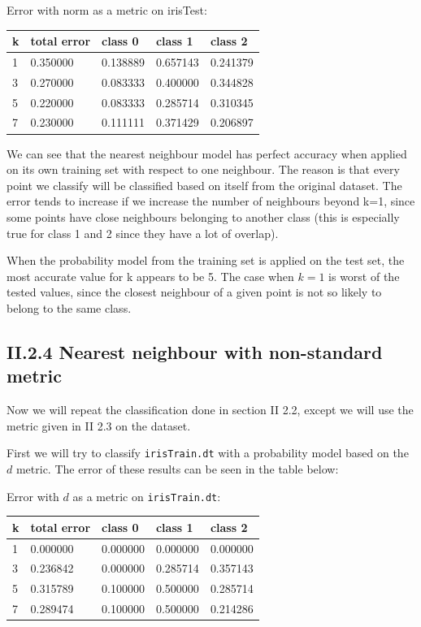 \documentclass[a4paper,10pt]{article}
\begin{document}
Error with norm as a metric on irisTest:
\begin{center}
\begin{tabular}{l|llll}
 k & total error & class 0 & class 1 & class 2\\ \hline
 1 & 0.350000 & 0.138889 & 0.657143 & 0.241379\\
 3 & 0.270000 & 0.083333 & 0.400000 & 0.344828\\
 5 & 0.220000 & 0.083333 & 0.285714 & 0.310345\\
 7 & 0.230000 & 0.111111 & 0.371429 & 0.206897\\
\end{tabular}
\end{center}

We can see that the nearest neighbour model has perfect accuracy when
applied on its own training set with respect to one neighbour. The reason
is that every point we classify will be classified based on itself from
the original dataset. The error tends to increase if we increase the number of
neighbours beyond k=1, since some points have close neighbours belonging to another class (this is especially true for class 1 and 2 since they have a lot of overlap).

When the probability model from the training set is applied on the test set,
the most accurate value for k appears to be 5. The case when $k=1$ is worst
of the tested values, since the closest neighbour of a given point is not
so likely to belong to the same class.

\subsection*{II.2.4 Nearest neighbour with non-standard metric}

Now we will repeat the classification done in section II 2.2, except we will
use the metric given in II 2.3 on the dataset.

First we will try to classify \verb=irisTrain.dt= with a probability model based on the $d$ metric. The error of these results can be seen in the table below:

Error with $d$ as a metric on \verb=irisTrain.dt=:
\begin{center}
\begin{tabular}{l|llll}
 k & total error & class 0 & class 1 & class 2\\ \hline
 1 & 0.000000 & 0.000000 & 0.000000 & 0.000000\\
 3 & 0.236842 & 0.000000 & 0.285714 & 0.357143\\
 5 & 0.315789 & 0.100000 & 0.500000 & 0.285714\\
 7 & 0.289474 & 0.100000 & 0.500000 & 0.214286\\
\end{tabular}
\end{center}
\end{document}
